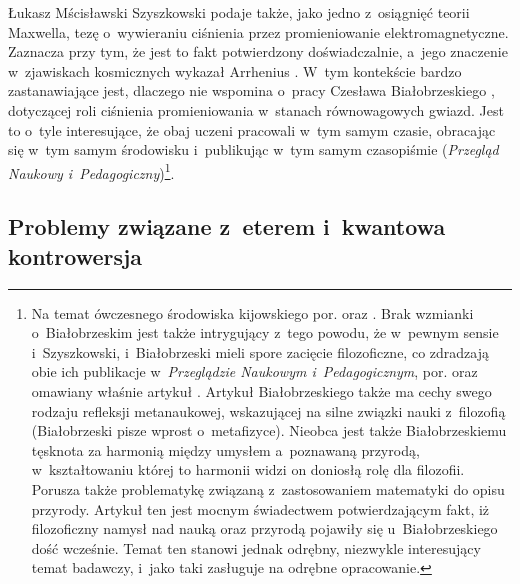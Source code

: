 \begin{artplenv}{Łukasz Mścisławski}
Szyszkowski podaje także, jako jedno z~osiągnięć teorii Maxwella, tezę o~wywieraniu ciśnienia przez promieniowanie elektromagnetyczne. Zaznacza przy tym, że jest to fakt potwierdzony doświadczalnie, a~jego znaczenie w~zjawiskach kosmicznych wykazał Arrhenius
\parencite*[][s.~91–220]{arrhenius_lehrbuch_1903}. %
 W~tym kontekście bardzo zastanawiające jest, dlaczego nie wspomina o~pracy Czesława Białobrzeskiego 
\parencite*[][]{bialobrzeski_sur_1913}, %
 dotyczącej roli ciśnienia promieniowania w~stanach równowagowych gwiazd. Jest to o~tyle interesujące, że obaj uczeni pracowali w~tym samym czasie, obracając się w~tym samym środowisku i~publikując w~tym samym czasopiśmie (\textit{Przegląd Naukowy i~Pedagogiczny})\footnote{Na temat ówczesnego środowiska kijowskiego por. 
\parencite[][]{roziewicz_polskie_1991} %
 oraz 
\parencite[][]{korzeniowski_za_2009}. %
 Brak wzmianki o~Białobrzeskim jest także intrygujący z~tego powodu, że w~pewnym sensie i~Szyszkowski, i~Białobrzeski mieli spore zacięcie filozoficzne, co zdradzają obie ich publikacje w~\textit{Przeglądzie Naukowym i~Pedagogicznym}, por. 
\parencite[][]{bialobrzeski_rzeczywistosc_1916} %
 oraz omawiany właśnie artykuł 
\parencite[][]{szyszkowski_o_1916}. %
 Artykuł Białobrzeskiego także ma cechy swego rodzaju refleksji metanaukowej, wskazującej na silne związki nauki z~filozofią (Białobrzeski pisze wprost o~metafizyce). Nieobca jest także Białobrzeskiemu tęsknota za harmonią między umysłem a~poznawaną przyrodą, w~kształtowaniu której to harmonii widzi on doniosłą rolę dla filozofii. Porusza także problematykę związaną z~zastosowaniem matematyki do opisu przyrody. Artykuł ten jest mocnym świadectwem potwierdzającym fakt, iż filozoficzny namysł nad nauką oraz przyrodą pojawiły się u~Białobrzeskiego dość wcześnie. Temat ten stanowi jednak odrębny, niezwykle interesujący temat badawczy, i~jako taki zasługuje na odrębne opracowanie.}.

\subsection{Problemy związane z~eterem i~kwantowa kontrowersja}


\end{artplenv}
